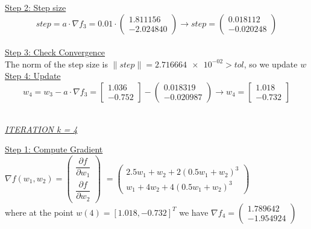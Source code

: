 \underline{Step 2: Step size}
\[
step = a \cdot \nabla f_{3} = 0.01 \cdot \left(\begin{array}{c}
	1.811156 \\
-2.024840
\end{array}\right) \rightarrow step =\left(\begin{array}{c}
	0.018112 \\
	-0.020248
\end{array}\right)
\]
\\[4mm]

\underline{Step 3: Check Convergence}\\
The norm of the step size is $\| step \| = \num{2.716664e-02} > tol$, so we update $w$
\\[4mm]

\underline{Step 4: Update}
\[ 
w_4 = w_3 - a\cdot \nabla f_3 =  \left[\begin{array}{c}
	1.036\\
	-0.752
\end{array}\right] - \left(\begin{array}{c}
	0.018319 \\
	-0.020987
\end{array}\right) \rightarrow
w_4 = \left[\begin{array}{c}
	1.018\\
	-0.732
\end{array}\right]
\]
\\[4mm]

\begin{center}
	\underline{\textit{ITERATION k = 4}}
\end{center}

\underline{Step 1: Compute Gradient}\\
\(\nabla f(w_1,w_2) = \left(\begin{array}{c}
	\dfrac{\partial f}{\partial w_1} \\[4mm]
	\dfrac{\partial f}{\partial w_2}
\end{array}\right)\) $= \left(\begin{array}{c}
	2.5w_1 + w_2 + 2(0.5w_1+w_2)^3\\[1mm]
	w_1 + 4w_2 + 4(0.5w_1+w_2)^3
\end{array}\right)$ \\[3mm]

where at the point $w\left(4\right) = \left[1.018, -0.732\right]^T$ we have $\nabla f_{4} = \left(\begin{array}{c}
	1.789642 \\
	-1.954924
\end{array}\right)$
\\[4mm]

